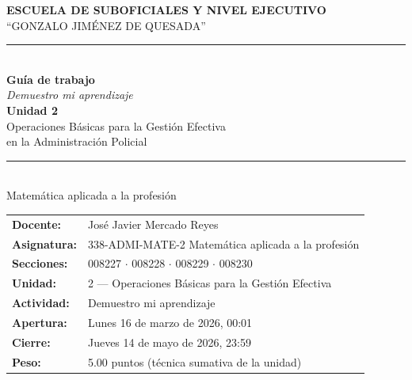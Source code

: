 \documentclass[11pt, a4paper]{article}
\begin{document}
\begin{titlepage}
\centering
\vspace*{1.5cm}

\begin{tcolorbox}[colback=policiaAzul, colframe=policiaDorado, boxrule=2pt, arc=4mm, left=20pt, right=20pt, top=20pt, bottom=20pt]
\color{white}
{\footnotesize\textbf{ESCUELA DE SUBOFICIALES Y NIVEL EJECUTIVO}}\\[2pt]
{\footnotesize ``GONZALO JIM\'ENEZ DE QUESADA''}\\[10pt]
\color{policiaDorado}
\rule{0.4\textwidth}{0.6pt}\\[10pt]
\color{white}
{\LARGE\textbf{Gu\'ia de trabajo}}\\[6pt]
{\Large \textit{Demuestro mi aprendizaje}}\\[10pt]
\color{policiaDorado}
{\large\textbf{Unidad 2}}\\[3pt]
\color{white}
{\large Operaciones B\'asicas para la Gesti\'on Efectiva}\\
{\large en la Administraci\'on Policial}\\[14pt]
\color{policiaDorado}\rule{0.4\textwidth}{0.6pt}\\[10pt]
\color{white}
{\normalsize Matem\'atica aplicada a la profesi\'on}
\end{tcolorbox}

\vspace{1.2cm}

\begin{tabular}{@{}p{}p{}@{}}
\textbf{\color{policiaAzul}Docente:} & Jos\'e Javier Mercado Reyes\\[5pt]
\textbf{\color{policiaAzul}Asignatura:} & 338-ADMI-MATE-2 Matem\'atica aplicada a la profesi\'on\\[5pt]
\textbf{\color{policiaAzul}Secciones:} & 008227 $\cdot$ 008228 $\cdot$ 008229 $\cdot$ 008230\\[5pt]
\textbf{\color{policiaAzul}Unidad:} & 2 --- Operaciones B\'asicas para la Gesti\'on Efectiva\\[5pt]
\textbf{\color{policiaAzul}Actividad:} & Demuestro mi aprendizaje\\[5pt]
\textbf{\color{policiaAzul}Apertura:} & Lunes 16 de marzo de 2026, 00:01\\[5pt]
\textbf{\color{policiaAzul}Cierre:} & Jueves 14 de mayo de 2026, 23:59\\[5pt]
\textbf{\color{policiaAzul}Peso:} & 5.00 puntos (t\'ecnica sumativa de la unidad)
\end{tabular}


\end{titlepage}
\end{document}
